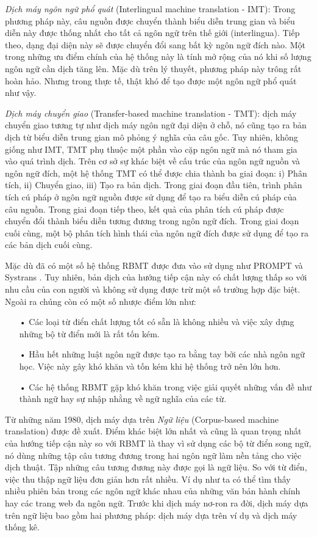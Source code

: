\textit{Dịch máy ngôn ngữ phổ quát} (Interlingual machine translation - IMT): Trong phương pháp này, câu nguồn được chuyển thành biểu diễn trung gian và biểu diễn này được thống nhất cho tất cả ngôn ngữ trên thế giới (interlingua). Tiếp theo, dạng đại diện này sẽ được chuyển đổi sang bất kỳ ngôn ngữ đích nào. Một trong những ưu điểm chính của hệ thống này là tính mở rộng của nó khi số lượng ngôn ngữ cần dịch tăng lên. Mặc dù trên lý thuyết, phương pháp này trông rất hoàn hảo. Nhưng trong thực tế, thật khó để tạo được một ngôn ngữ phổ quát như vậy.

\textit{Dịch máy chuyển giao} (Transfer-based machine translation - TMT): dịch máy chuyển giao tương tự như dịch máy ngôn ngữ đại diện ở chỗ, nó cũng tạo ra bản dịch từ biểu diễn trung gian mô phỏng ý nghĩa của câu gốc. Tuy nhiên, không giống như IMT, TMT phụ thuộc một phần vào cặp ngôn ngữ mà nó tham gia vào quá trình dịch. Trên cơ sở sự khác biệt về cấu trúc của ngôn ngữ nguồn và ngôn ngữ đích, một hệ thống TMT có thể được chia thành ba giai đoạn: i) Phân tích, ii) Chuyển giao, iii) Tạo ra bản dịch. Trong giai đoạn đầu tiên, trình phân tích cú pháp ở ngôn ngữ nguồn được sử dụng để tạo ra biểu diễn cú pháp của câu nguồn. Trong giai đoạn tiếp theo, kết quả của phân tích cú pháp được chuyển đổi thành biểu diễn tương đương trong ngôn ngữ đích. Trong giai đoạn cuối cùng, một bộ phân tích hình thái của ngôn ngữ đích được sử dụng để tạo ra các bản dịch cuối cùng.

Mặc dù đã có một số hệ thống RBMT được đưa vào sử dụng như PROMPT \cite{promt} và Systrans \cite{systrans}. Tuy nhiên, bản dịch của hướng tiếp cận này có chất lượng thấp so với nhu cầu của con người và không sử dụng được trừ một số trường hợp đặc biệt. Ngoài ra chúng còn có một số nhược điểm lớn như:
\begin{itemize}
	\item[•] Các loại từ điển chất lượng tốt có sẵn là không nhiều và việc xây dựng những bộ từ điển mới là rất tốn kém.
	\item[•] Hầu hết những luật ngôn ngữ được tạo ra bằng tay bởi các nhà ngôn ngữ học. Việc này gây khó khăn và tốn kém khi hệ thống trở nên lớn hơn.
	\item[•] Các hệ thống RBMT gặp khó khăn trong việc giải quyết những vấn đề như thành ngữ hay sự nhập nhằng về ngữ nghĩa của các từ. 
\end{itemize}
Từ những năm 1980, dịch máy dựa trên \textit{Ngữ liệu} (Corpus-based machine translation) được đề xuất. Điểm khác biệt lớn nhất và cũng là quan trọng nhất của hướng tiếp cận này so với RBMT là thay vì sử dụng các bộ từ điển song ngữ, nó dùng những tập câu tương đương trong hai ngôn ngữ làm nền tảng cho việc dịch thuật. Tập những câu tương đương này được gọi là ngữ liệu. So với từ điển, việc thu thập ngữ liệu đơn giản hơn rất nhiều. Ví dụ như ta có thể tìm thấy nhiều phiên bản trong các ngôn ngữ khác nhau của những văn bản hành chính hay các trang web đa ngôn ngữ. Trước khi dịch máy nơ-ron ra đời, dịch máy dựa trên ngữ liệu bao gồm hai phương pháp: dịch máy dựa trên ví dụ và dịch máy thống kê.

